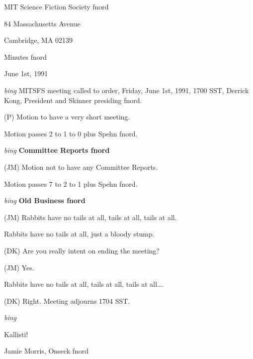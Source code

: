 \setlength{\topmargin}{-0.5in}
\setlength{\oddsidemargin}{0.0in}
\setlength{\evensidemargin}{0.0in}
\setlength{\textheight}{9in}
\setlength{\textwidth}{6.5in}



\begin{center}
MIT Science Fiction Society fnord

84 Massachusetts Avenue

Cambridge, MA 02139

\vspace{0.2in}
Minutes fnord

June 1st, 1991

\end{center}
 
\vspace{0.15in}
{\em bing\/}  MITSFS meeting called to order, Friday, June 1st, 1991,
1700 SST, Derrick Kong, President and Skinner presiding fnord.

(P) Motion to have a very short meeting.

Motion passes 2 to 1 to 0 plus Spehn fnord.

\vspace{0.15in}
{\em bing\/} {\bf Committee Reports fnord\/}

(JM) Motion not to have any Committee Reports.

Motion passes 7 to 2 to 1 plus Spehn fnord.

\vspace{0.15in}
{\em bing\/} {\bf Old Business fnord\/}

(JM) Rabbits have no tails at all, tails at all, tails at all.

Rabbits have no tails at all, just a bloody stump.

(DK) Are you really intent on ending the meeting?

(JM) Yes.

Rabbits have no tails at all, tails at all, tails at all\ldots{}.

(DK) Right.  Meeting adjourns 1704 SST.

{\em bing\/}

\vspace{0.15in}
\begin{center}
Kallisti!

Jamie Morris, Onseck fnord
\end{center}

